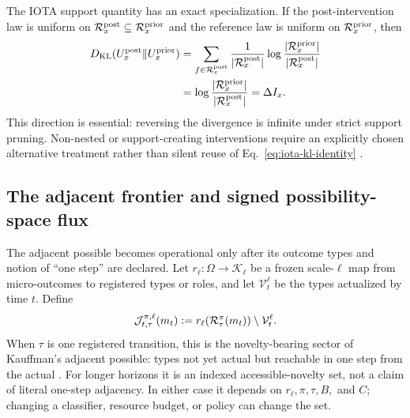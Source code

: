 The IOTA support quantity has an exact specialization. If the post-intervention
law is uniform on
$\mathcal{R}_x^{\mathrm{post}}\subseteq\mathcal{R}_x^{\mathrm{prior}}$ and the reference
law is uniform on $\mathcal{R}_x^{\mathrm{prior}}$, then
\begin{align}
 D_{\mathrm{KL}}(U_x^{\mathrm{post}}\Vert U_x^{\mathrm{prior}})
 &=\sum_{f\in\mathcal{R}_x^{\mathrm{post}}}
   \frac{1}{|\mathcal{R}_x^{\mathrm{post}}|}
   \log\frac{|\mathcal{R}_x^{\mathrm{prior}}|}
                 {|\mathcal{R}_x^{\mathrm{post}}|} \notag\\
 &=\log\frac{|\mathcal{R}_x^{\mathrm{prior}}|}
                  {|\mathcal{R}_x^{\mathrm{post}}|}
 =\Delta I_x .
 \label{eq:iota-kl-identity}
\end{align}
This direction is essential: reversing the divergence is infinite under strict
support pruning. Non-nested or support-creating interventions require an
explicitly chosen alternative treatment rather than silent reuse of
Eq.~\eqref{eq:iota-kl-identity} \citep{Clark2026IotaConstraint}.

\subsection{The adjacent frontier and signed possibility-space flux}

The adjacent possible becomes operational only after its outcome types and
notion of ``one step'' are declared. Let
$r_\ell:\Omega\rightarrow\mathcal K_\ell$ be a frozen scale-$\ell$ map from
micro-outcomes to registered types or roles, and let $\mathcal V_t^\ell$ be the
types actualized by time $t$. Define
\begin{equation}
 \mathcal J_{t,\tau}^{\pi,\ell}(m_t)
 :=r_\ell\!\left(\mathcal{R}_\tau^\pi(m_t)\right)
   \setminus\mathcal V_t^\ell .
 \label{eq:adjacent-frontier}
\end{equation}
When $\tau$ is one registered transition, this is the novelty-bearing sector
of Kauffman's adjacent possible: types not yet actual but reachable in one step
from the actual \citep[p.~142]{Kauffman2000Investigations}. For longer horizons
it is an indexed accessible-novelty set, not a claim of literal one-step
adjacency. In either case it depends on $r_\ell,\pi,\tau,B,$ and $C$; changing a
classifier, resource budget, or policy can change the set.

